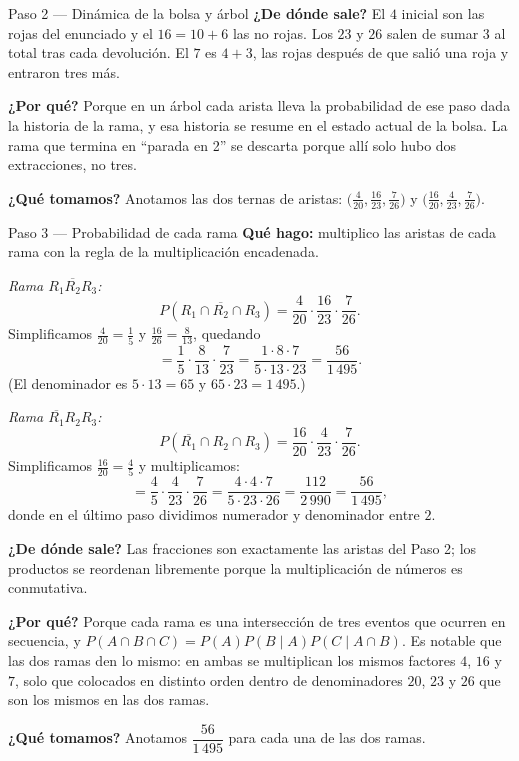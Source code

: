 \documentclass[11pt]{article}
\begin{document}
\begin{paso}{Paso 2 --- Dinámica de la bolsa y árbol}
\textbf{¿De dónde sale?} El $4$ inicial son las rojas del enunciado y el $16=10+6$ las no rojas. Los $23$ y $26$ salen de sumar $3$ al total tras cada devolución. El $7$ es $4+3$, las rojas después de que salió una roja y entraron tres más.

\textbf{¿Por qué?} Porque en un árbol cada arista lleva la probabilidad de ese paso dada la historia de la rama, y esa historia se resume en el estado actual de la bolsa. La rama que termina en ``parada en 2'' se descarta porque allí solo hubo dos extracciones, no tres.

\textbf{¿Qué tomamos?} Anotamos las dos ternas de aristas: $\bigl(\tfrac{4}{20},\tfrac{16}{23},\tfrac{7}{26}\bigr)$ y $\bigl(\tfrac{16}{20},\tfrac{4}{23},\tfrac{7}{26}\bigr)$.
\end{paso}

\begin{paso}{Paso 3 --- Probabilidad de cada rama}
\textbf{Qué hago:} multiplico las aristas de cada rama con la regla de la multiplicación encadenada.

\emph{Rama $R_1\overline{R_2}R_3$:}
\[
P(R_1\cap\overline{R_2}\cap R_3)=\frac{4}{20}\cdot\frac{16}{23}\cdot\frac{7}{26}.
\]
Simplificamos $\tfrac{4}{20}=\tfrac15$ y $\tfrac{16}{26}=\tfrac{8}{13}$, quedando
\[
=\frac{1}{5}\cdot\frac{8}{13}\cdot\frac{7}{23}
=\frac{1\cdot 8\cdot 7}{5\cdot 13\cdot 23}
=\frac{56}{1\,495}.
\]
(El denominador es $5\cdot 13=65$ y $65\cdot 23=1\,495$.)

\emph{Rama $\overline{R_1}R_2R_3$:}
\[
P(\overline{R_1}\cap R_2\cap R_3)=\frac{16}{20}\cdot\frac{4}{23}\cdot\frac{7}{26}.
\]
Simplificamos $\tfrac{16}{20}=\tfrac45$ y multiplicamos:
\[
=\frac{4}{5}\cdot\frac{4}{23}\cdot\frac{7}{26}
=\frac{4\cdot 4\cdot 7}{5\cdot 23\cdot 26}
=\frac{112}{2\,990}
=\frac{56}{1\,495},
\]
donde en el último paso dividimos numerador y denominador entre $2$.

\textbf{¿De dónde sale?} Las fracciones son exactamente las aristas del Paso 2; los productos se reordenan libremente porque la multiplicación de números es conmutativa.

\textbf{¿Por qué?} Porque cada rama es una intersección de tres eventos que ocurren en secuencia, y $P(A\cap B\cap C)=P(A)P(B\mid A)P(C\mid A\cap B)$. Es notable que las dos ramas den lo mismo: en ambas se multiplican los mismos factores $4$, $16$ y $7$, solo que colocados en distinto orden dentro de denominadores $20$, $23$ y $26$ que son los mismos en las dos ramas.

\textbf{¿Qué tomamos?} Anotamos $\dfrac{56}{1\,495}$ para cada una de las dos ramas.
\end{paso}
\end{document}
